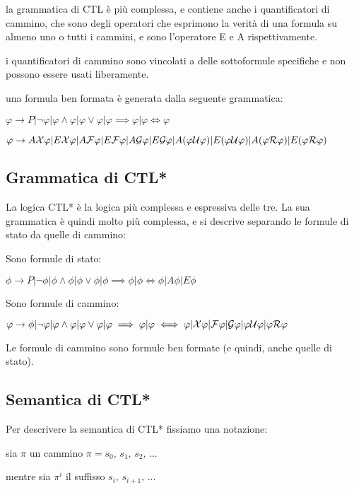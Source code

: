 la grammatica di CTL è più complessa, e contiene anche i quantificatori
di cammino, che sono degli operatori che esprimono la verità di una
formula su almeno uno o tutti i cammini, e sono l'operatore E e A
rispettivamente.

i quantificatori di cammino sono vincolati a delle sottoformule specifiche
e non possono essere usati liberamente.

una formula ben formata è generata dalla seguente grammatica:

$\varphi\rightarrow P|\neg\varphi|\varphi\wedge\varphi|\varphi\vee\varphi|\varphi\implies\varphi|\varphi\iff\varphi$

$\varphi\rightarrow A\mathcal{X}\varphi|E\mathcal{X}\varphi|A\mathcal{F}\varphi|E\mathcal{F}\varphi|A\mathcal{G}\varphi|E\mathcal{G}\varphi|A(\varphi\mathcal{U}\varphi)|E(\varphi\mathcal{U}\varphi)|A(\varphi\mathcal{R}\varphi)|E(\varphi\mathcal{R}\varphi)$


\subsection{Grammatica di CTL{*}}

La logica CTL{*} è la logica più complessa e espressiva delle tre.
La sua grammatica è quindi molto più complessa, e si descrive separando
le formule di stato da quelle di cammino:

Sono formule di stato:

$\phi\rightarrow P|\neg\phi|\phi\wedge\phi|\phi\vee\phi|\phi\implies\phi|\phi\iff\phi|A\phi|E\phi$

Sono formule di cammino:

$\varphi\rightarrow\phi|\neg\varphi|\varphi\wedge\varphi|\varphi\vee\varphi|\varphi\implies\varphi|\varphi\iff\varphi|\mathcal{X}\varphi|\mathcal{F}\varphi|\mathcal{G}\varphi|\varphi\mathcal{U}\varphi|\varphi\mathcal{R}\varphi$

Le formule di cammino sono formule ben formate (e quindi, anche quelle
di stato).


\subsection{Semantica di CTL{*}}

Per descrivere la semantica di CTL{*} fissiamo una notazione:

sia $\pi$ un cammino $\pi=s_{0},\, s_{1},\, s_{2},\,...$

mentre sia $\pi^{i}$ il suffisso $s_{i},\, s_{i+1},\,...$

